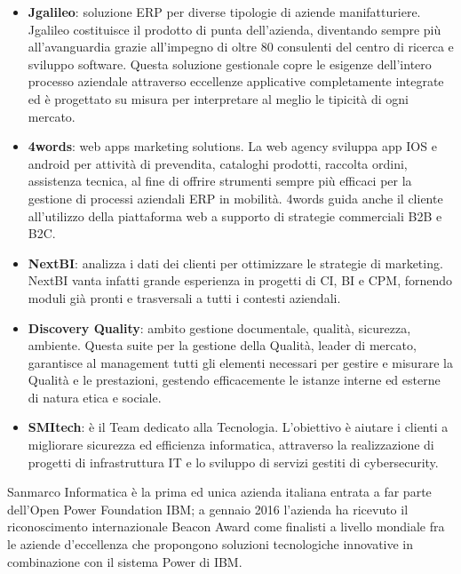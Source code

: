 \begin{itemize}
	\item \textbf{Jgalileo}: soluzione \Gls{ERP} per diverse tipologie di aziende manifatturiere. Jgalileo costituisce il prodotto di punta dell'azienda, diventando sempre più all'avanguardia grazie all'impegno di oltre 80 consulenti del centro di ricerca e sviluppo software. Questa soluzione gestionale copre le esigenze dell'intero processo aziendale attraverso eccellenze applicative completamente integrate ed è progettato su misura per interpretare al meglio le tipicità di ogni mercato.	
	\item \textbf{4words}: web apps marketing solutions. La web agency sviluppa app \gls{IOS} e \Gls{android} per attività di prevendita, cataloghi prodotti, raccolta ordini, assistenza tecnica, al fine di offrire strumenti sempre più efficaci per la gestione di processi aziendali ERP in mobilità. 4words guida anche il cliente all'utilizzo della piattaforma web a supporto di strategie commerciali \Gls{B2B} e \Gls{B2C}.
	\item \textbf{NextBI}: analizza i dati dei clienti per ottimizzare le strategie di marketing. NextBI vanta infatti grande esperienza in progetti di \gls{CI}, \Gls{BI} e \Gls{CPM}, fornendo moduli già pronti e trasversali a tutti i contesti aziendali.
	\item \textbf{Discovery Quality}: ambito gestione documentale, qualità, sicurezza, ambiente. Questa suite per la gestione della Qualità, leader di mercato, garantisce al management tutti gli elementi necessari per gestire e misurare la Qualità e le prestazioni, gestendo efficacemente le istanze interne ed esterne di natura etica e sociale.
	\item \textbf{SMItech}: è il Team dedicato alla Tecnologia. L'obiettivo è aiutare i clienti a migliorare sicurezza ed efficienza informatica, attraverso la realizzazione di progetti di infrastruttura IT e lo sviluppo di servizi gestiti di \Gls{cybersecurity}.
\end{itemize}
Sanmarco Informatica è la prima ed unica azienda italiana entrata a far parte dell'\Gls{Open Power Foundation IBM}; a gennaio 2016 l'azienda ha ricevuto il riconoscimento internazionale \Gls{Beacon Award} come finalisti a livello mondiale fra le aziende d'eccellenza che propongono soluzioni tecnologiche innovative in combinazione con il sistema \Gls{Power} di IBM.


